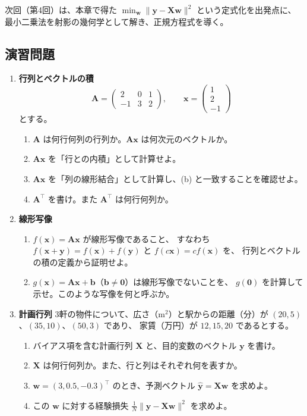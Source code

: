 次回（第4回）は、本章で得た
$\min_{\bm{w}} \|\bm{y} - \bm{X}\bm{w}\|^2$ という定式化を出発点に、
最小二乗法を射影の幾何学として解き、正規方程式を導く。


\subsection{演習問題}

\begin{enumerate}
  \item \textbf{行列とベクトルの積}\quad
    \begin{equation*}
      \bm{A} = \begin{pmatrix} 2 & 0 & 1 \\ -1 & 3 & 2 \end{pmatrix}, \qquad
      \bm{x} = \begin{pmatrix} 1 \\ 2 \\ -1 \end{pmatrix}
    \end{equation*}
    とする。
    \begin{enumerate}
      \item $\bm{A}$ は何行何列の行列か。$\bm{A}\bm{x}$ は何次元のベクトルか。
      \item $\bm{A}\bm{x}$ を「行との内積」として計算せよ。
      \item $\bm{A}\bm{x}$ を「列の線形結合」として計算し、(b) と一致することを確認せよ。
      \item $\bm{A}^\top$ を書け。また $\bm{A}^\top$ は何行何列か。
    \end{enumerate}

  \item \textbf{線形写像}\quad
    \begin{enumerate}
      \item $f(\bm{x}) = \bm{A}\bm{x}$ が線形写像であること、
        すなわち $f(\bm{x}+\bm{y}) = f(\bm{x}) + f(\bm{y})$ と $f(c\bm{x}) = cf(\bm{x})$ を、
        行列とベクトルの積の定義から証明せよ。
      \item $g(\bm{x}) = \bm{A}\bm{x} + \bm{b}$（$\bm{b} \neq \bm{0}$）は線形写像でないことを、
        $g(\bm{0})$ を計算して示せ。このような写像を何と呼ぶか。
    \end{enumerate}

  \item \textbf{計画行列}\quad
    3軒の物件について、広さ（$\mathrm{m}^2$）と駅からの距離（分）が
    $(20, 5)$、$(35, 10)$、$(50, 3)$ であり、
    家賃（万円）が $12, 15, 20$ であるとする。
    \begin{enumerate}
      \item バイアス項を含む計画行列 $\bm{X}$ と、目的変数のベクトル $\bm{y}$ を書け。
      \item $\bm{X}$ は何行何列か。また、行と列はそれぞれ何を表すか。
      \item $\bm{w} = (3, 0.5, -0.3)^\top$ のとき、予測ベクトル $\hat{\bm{y}} = \bm{X}\bm{w}$ を求めよ。
      \item この $\bm{w}$ に対する経験損失 $\frac{1}{N}\|\bm{y} - \bm{X}\bm{w}\|^2$ を求めよ。
    \end{enumerate}


\end{enumerate}
